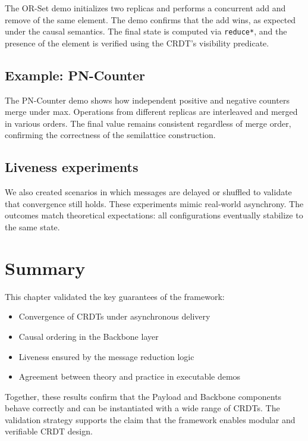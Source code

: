 The OR-Set demo initializes two replicas and performs a concurrent add and remove of the same element. The demo confirms that the add wins, as expected under the causal semantics. The final state is computed via \texttt{reduce*}, and the presence of the element is verified using the CRDT’s visibility predicate.

\subsection{Example: PN-Counter}

The PN-Counter demo shows how independent positive and negative counters merge under max. Operations from different replicas are interleaved and merged in various orders. The final value remains consistent regardless of merge order, confirming the correctness of the semilattice construction.

\subsection{Liveness experiments}

We also created scenarios in which messages are delayed or shuffled to validate that convergence still holds. These experiments mimic real-world asynchrony. The outcomes match theoretical expectations: all configurations eventually stabilize to the same state.

\section{Summary}

This chapter validated the key guarantees of the framework:

\begin{itemize}
  \item Convergence of CRDTs under asynchronous delivery
  \item Causal ordering in the Backbone layer
  \item Liveness ensured by the message reduction logic
  \item Agreement between theory and practice in executable demos
\end{itemize}

Together, these results confirm that the Payload and Backbone components behave correctly and can be instantiated with a wide range of CRDTs. The validation strategy supports the claim that the framework enables modular and verifiable CRDT design.


